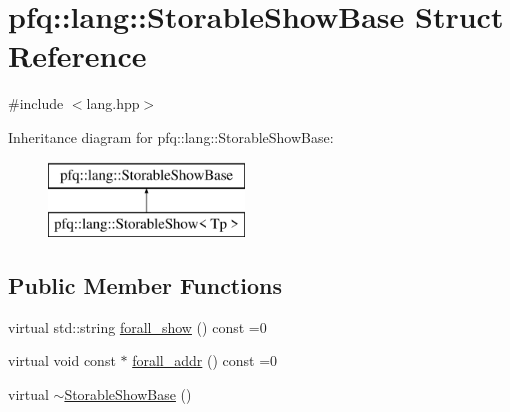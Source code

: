 \hypertarget{structpfq_1_1lang_1_1StorableShowBase}{\section{pfq\+:\+:lang\+:\+:Storable\+Show\+Base Struct Reference}
\label{structpfq_1_1lang_1_1StorableShowBase}
}


{\ttfamily \#include $<$lang.\+hpp$>$}

Inheritance diagram for pfq\+:\+:lang\+:\+:Storable\+Show\+Base\+:\begin{figure}[H]
\begin{center}
\leavevmode
\includegraphics[height=2.000000cm]{structpfq_1_1lang_1_1StorableShowBase}
\end{center}
\end{figure}
\subsection*{Public Member Functions}
\begin{DoxyCompactItemize}
\item 
virtual std\+::string \hyperlink{structpfq_1_1lang_1_1StorableShowBase_a1c6d20492a999c961c1120dce33a131d}{forall\+\_\+show} () const =0
\item 
virtual void const $\ast$ \hyperlink{structpfq_1_1lang_1_1StorableShowBase_a4b7712509609a2cb18dccf6b699d6ed9}{forall\+\_\+addr} () const =0
\item 
virtual \hyperlink{structpfq_1_1lang_1_1StorableShowBase_a8d4e90f7d227a8f5c0ca14ed7bdd0b5f}{$\sim$\+Storable\+Show\+Base} ()
\end{DoxyCompactItemize}

